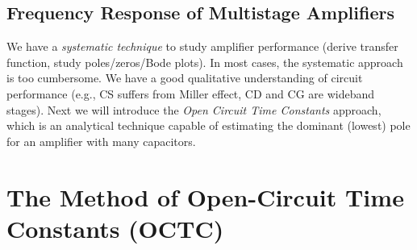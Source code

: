 \subsection{Frequency Response of Multistage Amplifiers}
We have a \textit{systematic technique} to study amplifier performance (derive transfer function, study poles/zeros/Bode plots).  In most cases, the systematic approach is too cumbersome. We have a good qualitative understanding of circuit performance (e.g., CS suffers from Miller effect, CD and CG are wideband stages).  Next we will introduce the \textit{Open Circuit Time Constants} approach, which is an analytical technique capable of estimating  the dominant (lowest) pole for an amplifier with many capacitors.
\newpage
\section{The Method of Open-Circuit Time Constants (OCTC)}
